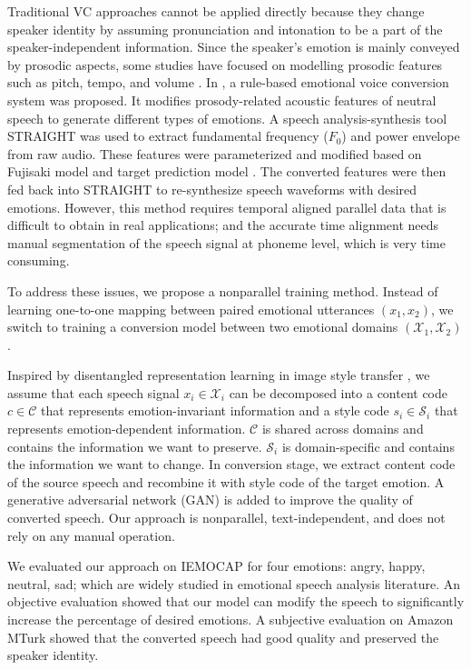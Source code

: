 \documentclass{article}
\begin{document}
Traditional VC approaches cannot be applied directly because they change speaker identity by assuming pronunciation and intonation to be a part of the speaker-independent information. Since the speaker's emotion is mainly conveyed by prosodic aspects, some studies have focused on modelling prosodic features such as pitch, tempo, and volume \cite{wang2012emotional,wang2014multi}. In \cite{xue2018voice}, a rule-based emotional voice conversion system was proposed. It modifies prosody-related acoustic features of neutral speech to generate different types of emotions. A speech analysis-synthesis tool STRAIGHT \cite{kawahara1999restructuring} was used to extract fundamental frequency ($F_0$) and power envelope from raw audio. These features were parameterized and modified based on Fujisaki model \cite{fujisaki1984analysis} and target prediction model \cite{xue2016study}. The converted features were then fed back into STRAIGHT to re-synthesize speech waveforms with desired emotions. However, this method requires temporal aligned parallel data that is difficult to obtain in real applications; and the accurate time alignment needs manual segmentation of the speech signal at phoneme level, which is very time consuming.

To address these issues, we propose a nonparallel training method. Instead of learning one-to-one mapping between paired emotional utterances $(x_1, x_2)$, we switch to training a conversion model between two emotional domains $(\mathcal{X}_1, \mathcal{X}_2)$.

Inspired by disentangled representation learning in image style transfer \cite{gatys2016image,Huang_2018_ECCV}, we assume that each speech signal $x_i \in \mathcal{X}_i$ can be decomposed into a content code $c \in \mathcal{C}$ that represents emotion-invariant information and a style code $s_i \in \mathcal{S}_i$ that represents emotion-dependent information. $\mathcal{C}$ is shared across domains and contains the information we want to preserve. $\mathcal{S}_i$ is domain-specific and contains the information we want to change. In conversion stage, we extract content code of the source speech and recombine it with style code of the target emotion. A generative adversarial network (GAN) \cite{goodfellow2014generative} is added to improve the quality of converted speech. Our approach is nonparallel, text-independent, and does not rely on any manual operation.

We evaluated our approach on IEMOCAP \cite{busso2008iemocap} for four emotions: angry, happy, neutral, sad; which are widely studied in emotional speech analysis literature.
An objective evaluation showed that our model can modify the speech to significantly increase the percentage of desired emotions. A subjective evaluation on Amazon MTurk showed that the converted speech had good quality and preserved the speaker identity.
\end{document}
